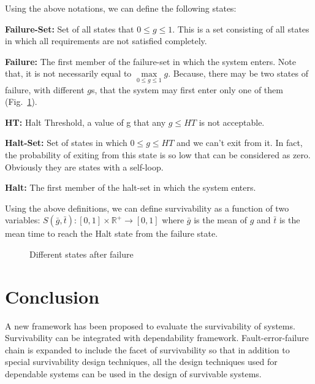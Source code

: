 \documentclass[onecolumn,conference]{IEEEtran}
\begin{document}
    Using the above notations, we can define the following states:

    \textbf{Failure-Set:} Set of all states that $0\leq g \leq1$. This is a set consisting of all states in which all requirements are not satisfied completely.

    \textbf{Failure:} The first member of the failure-set in which the system enters. Note that, it is not necessarily equal to $\max\limits_{0 \leq g \leq 1}g$. Because, there may be two states of failure, with different $g$s, that the system may first enter only one of them (Fig.~\ref{fig:4}).

    \textbf{HT:} Halt Threshold, a value of g that any $g \leq HT$ is not acceptable.

    \textbf{Halt-Set:} Set of states in which  $0 \leq g \leq HT$ and we can't exit from it. In fact, the probability of exiting from this state is so low that can be considered as zero. Obviously they are states with a self-loop.

    \textbf{Halt:} The first member of the halt-set in which the system enters.

    Using the above definitions, we can define survivability as a function of two variables: $S\left( \bar{g},\bar{t} \right):\left[ 0,1 \right]\times \mathbb{R}^+ \rightarrow \left[ 0,1 \right]$ where $\bar{g}$ is the mean of $g$ and $\bar{t}$ is the mean time to reach the Halt state from the failure state.

    \begin{figure}[htbp]
        \centering
        \caption{Different states after failure}
        \label{fig:4}
    \end{figure}

    \section{Conclusion} \label{sec:conc}
    A new framework has been proposed to evaluate the survivability of systems. Survivability can be integrated with dependability framework. Fault-error-failure chain is expanded to include the facet of survivability so that in addition to special survivability design techniques, all the design techniques used for dependable systems can be used in the design of survivable systems.
\end{document}
